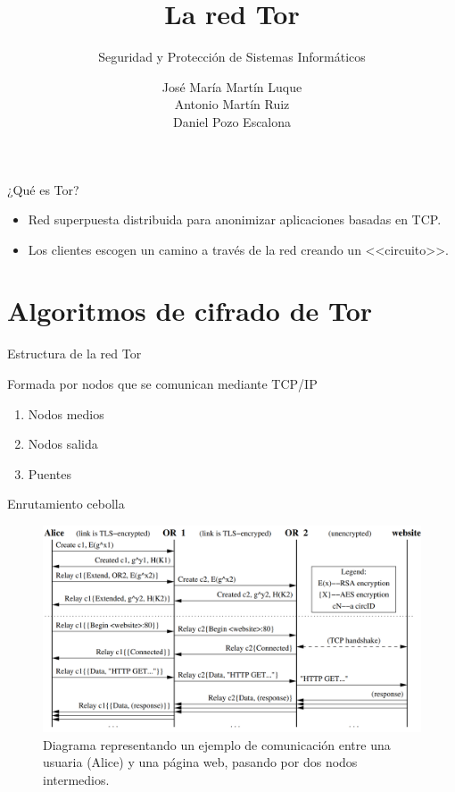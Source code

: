\documentclass[spanish]{beamer}
\title{La red Tor}
\subtitle{Seguridad y Protección de Sistemas Informáticos}
\author{
  José María Martín Luque \texorpdfstring{\\}{}
  Antonio Martín Ruiz \texorpdfstring{\\}{}
  Daniel Pozo Escalona
}
\begin{document}
\maketitle

\begin{frame}{¿Qué es Tor?}

  \begin{itemize}
    \item Red superpuesta distribuida para anonimizar aplicaciones basadas en TCP.
    \item Los clientes escogen un camino a través de la red creando un <<circuito>>.
  \end{itemize}

\end{frame}

\section{Algoritmos de cifrado de Tor}

\begin{frame}{Estructura de la red Tor}

Formada por nodos que se comunican mediante TCP/IP

  \begin{enumerate}

    \item Nodos medios

    \item Nodos salida

    \item Puentes

  \end{enumerate}

\end{frame}

\begin{frame}{Enrutamiento cebolla}

\begin{figure}[h]
  \includegraphics[width=\textwidth]{OR5.png}
  \caption{Diagrama representando un ejemplo de comunicación entre una usuaria (Alice) y una página web, pasando por dos nodos intermedios.}
  \label{fig:or5}
\end{figure}

\end{frame}
\end{document}
